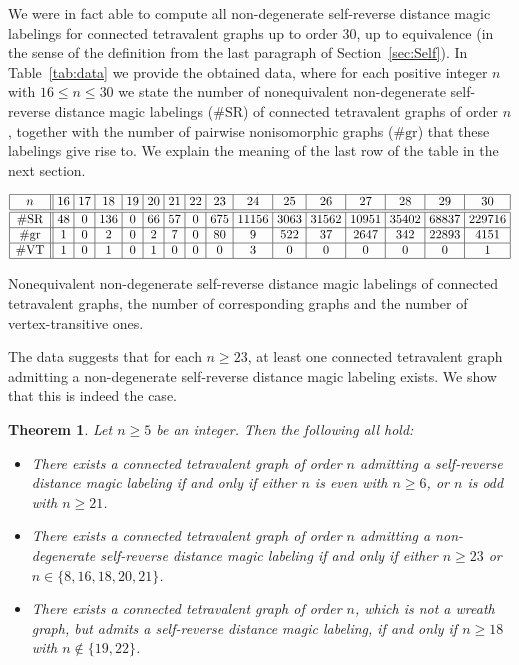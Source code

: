 \documentclass[11 pt,english]{article}
\newtheorem{theorem}{Theorem}[section]
\theoremstyle{definition}
\begin{document}
We were in fact able to compute all non-degenerate self-reverse distance magic labelings for connected tetravalent graphs up to order $30$, up to equivalence (in the sense of the definition from the last paragraph of Section~\ref{sec:Self}). In Table~\ref{tab:data} we provide the obtained data, where for each positive integer $n$ with $16 \leq n \leq 30$ we state the number of nonequivalent non-degenerate self-reverse distance magic labelings ($\# \text{SR}$) of connected tetravalent graphs of order $n$, together with the number of pairwise nonisomorphic graphs ($\# \text{gr}$) that these labelings give rise to. We explain the meaning of the last row of the table in the next section.
%
\begin{table}
$$
\begin{array}{|c||@{\ }c@{\ }|@{\ }c@{\ }|@{\ }c@{\ }|@{\ }c@{\ }|@{\ }c@{\ }|@{\ }c@{\ }|@{\ }c@{\ }|@{\ }c@{\ }|@{\ }c@{\ }|@{\ }c@{\ }|@{\ }c@{\ }|@{\ }c@{\ }|@{\ }c@{\ }|@{\ }c@{\ }|@{\ }c@{\ }|}
\hline
n & 16 & 17 & 18 & 19 & 20 & 21 & 22 & 23 & 24 & 25 & 26 & 27 & 28 & 29 & 30 \\ \hline \hline
\# \text{SR} & 48 & 0 & 136 & 0 & 66 & 57 & 0 & 675 & 11156 & 3063 & 31562 & 10951 & 35402 & 68837 & 229716 \\
\hline 
\# \text{gr} & 1 & 0 & 2 & 0 & 2 & 7 & 0 & 80 & 9 & 522 & 37 & 2647 & 342 & 22893 & 4151 \\
\hline
\# \text{VT} & 1 & 0 & 1 & 0 & 1 & 0 & 0 & 0 & 3 & 0 & 0 & 0 & 0 & 0 & 1 \\
\hline
\end{array}
$$
\caption{Nonequivalent non-degenerate self-reverse distance magic labelings of connected tetravalent graphs, the number of corresponding graphs and the number of vertex-transitive ones.}
\label{tab:data}
\end{table}

The data suggests that for each $n \geq 23$, at least one connected tetravalent graph admitting a non-degenerate self-reverse distance magic labeling exists. We show that this is indeed the case.

\begin{theorem}
\label{the:classification}
Let $n \geq 5$ be an integer. Then the following all hold:
\begin{itemize}
\itemsep = 0pt
\item[(i)] There exists a connected tetravalent graph of order $n$ admitting a self-reverse distance magic labeling if and only if either $n$ is even with $n \geq 6$, or $n$ is odd with $n \geq 21$.
\item[(ii)] There exists a connected tetravalent graph of order $n$ admitting a non-degenerate self-reverse distance magic labeling if and only if either $n \geq 23$ or $n \in \{8, 16, 18, 20, 21\}$. 
\item[(iii)] There exists a connected tetravalent graph of order $n$, which is not a wreath graph, but admits a self-reverse distance magic labeling, if and only if $n \geq 18$ with $n \notin \{19, 22\}$.
\end{itemize}
\end{theorem}
\end{document}
